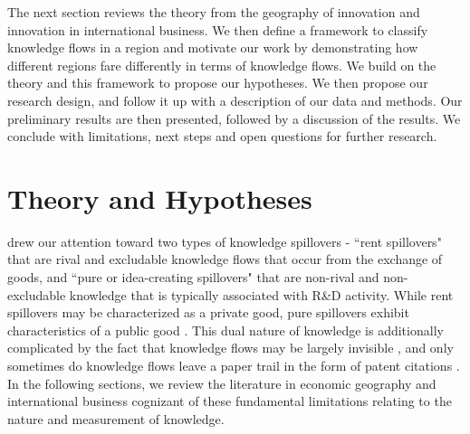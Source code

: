 \documentclass[12pt,letterpaper]{article}
\begin{document}
The next section reviews the theory from the geography of innovation and innovation in international business. We then define a framework to classify knowledge flows in a region and motivate our work by demonstrating how different regions fare differently in terms of knowledge flows. We build on the theory and this framework to propose our hypotheses. We then propose our research design, and follow it up with a description of our data and methods. Our preliminary results are then presented, followed by a discussion of the results. We conclude with limitations, next steps and open questions for further research.



\section*{Theory and Hypotheses}
\cite{Griliches1979} drew our attention toward two types of knowledge spillovers - ``rent spillovers" that  are rival and excludable knowledge flows that occur from the exchange of goods, and ``pure or idea-creating spillovers"  that are non-rival and non-excludable knowledge that is typically associated with R\&D activity. While rent spillovers may be characterized as a private good, pure spillovers exhibit characteristics of a public good \citep{Arrow1962}.  This dual nature of knowledge is additionally complicated by the fact that knowledge flows may be largely invisible \cite{Krugman1991a}, and only sometimes do knowledge flows leave a paper trail in the form of patent citations \cite{Jaffe1993}. In the following sections, we review the literature in economic geography and international business cognizant of these fundamental limitations relating to the nature and measurement of knowledge.
\end{document}
